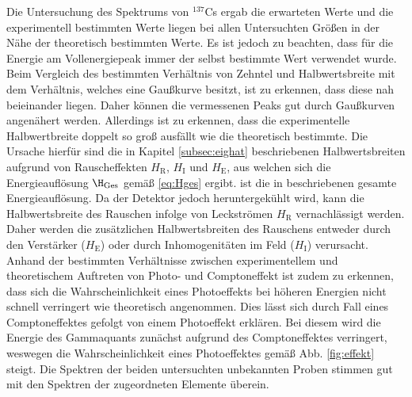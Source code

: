Die Untersuchung des Spektrums von $^{137}$Cs ergab die erwarteten Werte und die experimentell bestimmten Werte liegen bei allen Untersuchten Größen in der Nähe der theoretisch bestimmten Werte. Es ist jedoch zu beachten, dass für die Energie am Vollenergiepeak immer der selbst bestimmte Wert verwendet wurde. Beim Vergleich des bestimmten Verhältnis von Zehntel und Halbwertsbreite mit dem Verhältnis, welches eine Gaußkurve besitzt, ist zu erkennen, dass diese nah beieinander liegen. Daher können die vermessenen Peaks gut durch Gaußkurven angenähert werden. Allerdings ist zu erkennen, dass die experimentelle Halbwertbreite doppelt so groß ausfällt wie die theoretisch bestimmte. Die Ursache hierfür sind die in Kapitel \ref{subsec:eighat} beschriebenen Halbwertsbreiten aufgrund von Rauscheffekten $H_\text{R}$, $H_\text{I}$ und $H_\text{E}$, aus welchen sich die Energieauflösung $\H_\text{Ges}$ gemäß \eqref{eq:Hges} ergibt. ist die in  beschriebenen gesamte Energieauflösung. Da der Detektor jedoch heruntergekühlt wird, kann die Halbwertsbreite des Rauschen infolge von Leckströmen $H_\text{R}$ vernachlässigt werden. Daher werden die zusätzlichen Halbwertsbreiten des Rauschens entweder durch den Verstärker ($H_\text{E}$) oder durch Inhomogenitäten im Feld ($H_\text{I}$) verursacht. Anhand der bestimmten Verhältnisse zwischen experimentellem und theoretischem Auftreten von Photo- und Comptoneffekt ist zudem zu erkennen, dass sich die Wahrscheinlichkeit eines Photoeffekts bei höheren Energien nicht schnell verringert wie theoretisch angenommen. Dies lässt sich durch Fall eines Comptoneffektes gefolgt von einem Photoeffekt erklären. Bei diesem wird die Energie des Gammaquants zunächst aufgrund des Comptoneffektes verringert, weswegen die Wahrscheinlichkeit eines Photoeffektes gemäß Abb. \ref{fig:effekt} steigt.
Die Spektren der beiden untersuchten unbekannten Proben stimmen gut mit den Spektren der zugeordneten Elemente überein.
